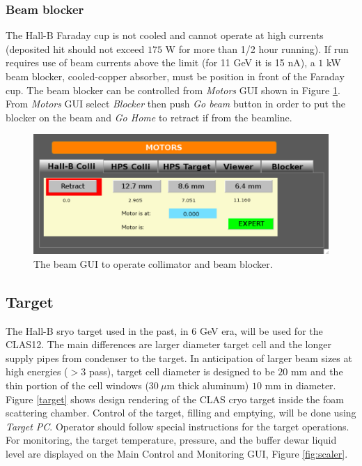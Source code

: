 \documentclass[12pt]{article}
\begin{document}
\subsubsection{Beam blocker}
\label{subsec:blocker}
\indent

The Hall-B Faraday cup is not cooled and cannot operate at high currents (deposited hit should not exceed $175$ W for more than 1/2 hour running). If run requires use of beam currents above the limit (for 11 GeV it is 15 nA), a $1$ kW beam blocker, cooled-copper absorber, must be position in front of the Faraday cup. The beam blocker can be controlled from {\it Motors} GUI shown in Figure \ref{fig:beamblocker}.  From {\it Motors} GUI select {\it Blocker} then push {\it Go beam} button  in order to put the blocker on the beam and {\it Go Home} to retract if from the beamline. 

\begin{figure}[tbhp]
{\centering \includegraphics[scale=0.65]{collimator.pdf} \par}
\caption{The beam GUI to operate collimator and beam blocker. \label{fig:beamblocker}}
\end{figure}


\clearpage

\subsection{\bf Target}
\indent

The Hall-B sryo target used in the past, in $6$ GeV era, will be used for the CLAS12. The main differences are larger diameter target cell and the longer supply pipes from condenser to the target. In anticipation of larger beam sizes at high energies ($> 3$ pass), target cell diameter is designed to be $20$ mm and the thin portion of the cell windows ($30~\mu$m thick aluminum) $10$ mm in diameter. Figure \ref{target} shows design rendering of the CLAS cryo target inside the foam scattering chamber. Control of the target, filling and emptying, will be done using {\it Target PC}. Operator should follow special instructions for the target operations. For monitoring, the target temperature, pressure, and the buffer dewar liquid level are displayed on the Main Control and Monitoring GUI, Figure \ref{fig:scaler}. 
\end{document}
